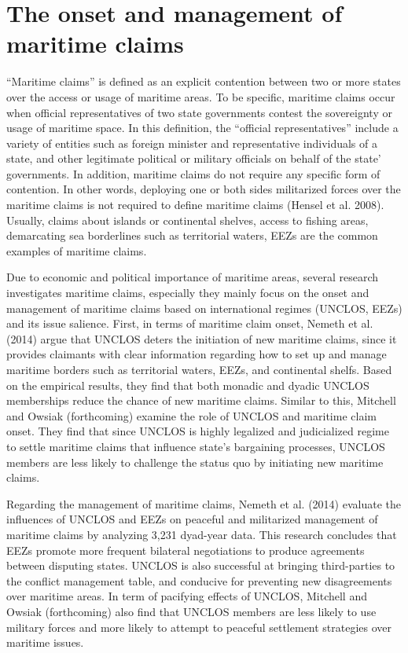 \documentclass{article}
\begin{document}
\section*{The onset and management of maritime claims}
\hspace{0.5cm}“Maritime claims” is defined as an explicit contention between two or more states over the access or usage of maritime areas. To be specific, maritime claims occur when official representatives of two state governments contest the sovereignty or usage of maritime space. In this definition, the “official representatives” include a variety of entities such as foreign minister and representative individuals of a state, and other legitimate political or military officials on behalf of the state’ governments. In addition, maritime claims do not require any specific form of contention. In other words, deploying one or both sides militarized forces over the maritime claims is not required to define maritime claims (Hensel et al. 2008). Usually, claims about islands or continental shelves, access to fishing areas, demarcating sea borderlines such as territorial waters, EEZs are the common examples of maritime claims.

Due to economic and political importance of maritime areas, several research investigates maritime claims, especially they mainly focus on the onset and management of maritime claims based on international regimes (UNCLOS, EEZs) and its issue salience. First, in terms of maritime claim onset, Nemeth et al. (2014) argue that UNCLOS deters the initiation of new maritime claims, since it provides claimants with clear information regarding how to set up and manage maritime borders such as territorial waters, EEZs, and continental shelfs. Based on the empirical results, they find that both monadic and dyadic UNCLOS memberships reduce the chance of new maritime claims. Similar to this, Mitchell and Owsiak (forthcoming) examine the role of UNCLOS and maritime claim onset. They find that since UNCLOS is highly legalized and judicialized regime to settle maritime claims that influence state’s bargaining processes, UNCLOS members are less likely to challenge the status quo by initiating new maritime claims. 

Regarding the management of maritime claims, Nemeth et al. (2014) evaluate the influences of UNCLOS and EEZs on peaceful and militarized management of maritime claims by analyzing 3,231 dyad-year data. This research concludes that EEZs promote more frequent bilateral negotiations to produce agreements between disputing states. UNCLOS is also successful at bringing third-parties to the conflict management table, and conducive for preventing new disagreements over maritime areas. In term of pacifying effects of UNCLOS, Mitchell and Owsiak (forthcoming) also find that UNCLOS members are less likely to use military forces and more likely to attempt to peaceful settlement strategies over maritime issues.  
 
\end{document}
